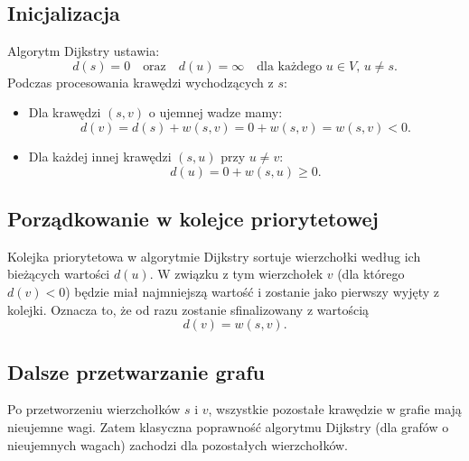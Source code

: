 \documentclass[12pt]{article}
\begin{document}
\subsection*{Inicjalizacja}

Algorytm Dijkstry ustawia:
\[
d(s)=0 \quad \text{oraz} \quad d(u)=\infty \quad \text{dla każdego } u \in V,\, u\neq s.
\]
Podczas procesowania krawędzi wychodzących z \( s \):
\begin{itemize}
    \item Dla krawędzi \((s,v)\) o ujemnej wadze mamy:
    \[
    d(v) = d(s) + w(s,v) = 0 + w(s,v) = w(s,v) < 0.
    \]
    \item Dla każdej innej krawędzi \((s,u)\) przy \( u \neq v \):
    \[
    d(u) = 0 + w(s,u) \ge 0.
    \]
\end{itemize}

\subsection*{Porządkowanie w kolejce priorytetowej}

Kolejka priorytetowa w algorytmie Dijkstry sortuje wierzchołki według ich bieżących wartości \( d(u) \). W związku z tym wierzchołek \( v \) (dla którego \( d(v) < 0 \)) będzie miał najmniejszą wartość i zostanie jako pierwszy wyjęty z kolejki. Oznacza to, że od razu zostanie sfinalizowany z wartością
\[
d(v)=w(s,v).
\]

\subsection*{Dalsze przetwarzanie grafu}

Po przetworzeniu wierzchołków \( s \) i \( v \), wszystkie pozostałe krawędzie w grafie mają nieujemne wagi. Zatem klasyczna poprawność algorytmu Dijkstry (dla grafów o nieujemnych wagach) zachodzi dla pozostałych wierzchołków.
\end{document}
